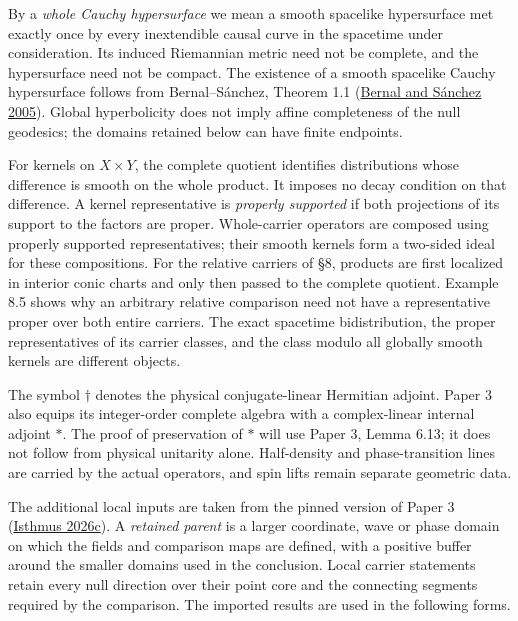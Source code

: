 \documentclass[
  english,
  11pt,
  reqno]{amsart}
\begin{document}
By a \emph{whole Cauchy hypersurface} we mean a smooth spacelike
hypersurface met exactly once by every inextendible causal curve in the
spacetime under consideration. Its induced Riemannian metric need not be
complete, and the hypersurface need not be compact. The existence of a
smooth spacelike Cauchy hypersurface follows from Bernal--Sánchez,
Theorem 1.1 (\hyperref[ref-BernalSanchez2005]{Bernal and Sánchez 2005}).
Global hyperbolicity does not imply affine completeness of the null
geodesics; the domains retained below can have finite endpoints.

For kernels on \(X\times Y\), the complete quotient identifies
distributions whose difference is smooth on the whole product. It
imposes no decay condition on that difference. A kernel representative
is \emph{properly supported} if both projections of its support to the
factors are proper. Whole-carrier operators are composed using properly
supported representatives; their smooth kernels form a two-sided ideal
for these compositions. For the relative carriers of §8, products are
first localized in interior conic charts and only then passed to the
complete quotient. Example 8.5 shows why an arbitrary relative
comparison need not have a representative proper over both entire
carriers. The exact spacetime bidistribution, the proper representatives
of its carrier classes, and the class modulo all globally smooth kernels
are different objects.

The symbol \(\dagger\) denotes the physical conjugate-linear Hermitian
adjoint. Paper 3 also equips its integer-order complete algebra with a
complex-linear internal adjoint \(*\). The proof of preservation of
\(*\) will use Paper 3, Lemma 6.13; it does not follow from physical
unitarity alone. Half-density and phase-transition lines are carried by
the actual operators, and spin lifts remain separate geometric data.

The additional local inputs are taken from the pinned version of Paper 3
(\hyperref[ref-IsthmusSmooth2026]{Isthmus 2026c}). A \emph{retained
parent} is a larger coordinate, wave or phase domain on which the fields
and comparison maps are defined, with a positive buffer around the
smaller domains used in the conclusion. Local carrier statements retain
every null direction over their point core and the connecting segments
required by the comparison. The imported results are used in the
following forms.
\end{document}
